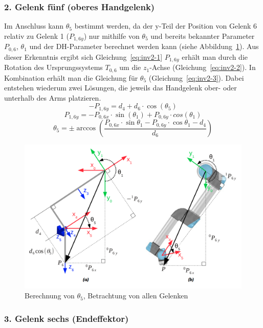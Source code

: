 \subsubsection{2. Gelenk fünf (oberes Handgelenk)}

Im Anschluss kann $\theta_5$ bestimmt werden, da der y-Teil der Position von Gelenk 6 relativ zu Gelenk 1 ($P_{1,6y}$) nur mithilfe von $\theta_5$ und bereits bekannter Parameter $P_{0,6}$, $\theta_1$ und der DH-Parameter berechnet werden kann (siehe Abbildung~\ref{fig:inv1-2}).
Aus dieser Erkenntnis ergibt sich Gleichung~\ref{eq:inv2-1}
$P_{1,6y}$ erhält man durch die Rotation des Ursprungssystems $T_{0,6}$ um die $z_1$-Achse (Gleichung~\ref{eq:inv2-2}).
In Kombination erhält man die Gleichung für $\theta_5$ (Gleichung~\ref{eq:inv2-3}).
Dabei entstehen wiederum zwei Lösungen, die jeweils das Handgelenk ober- oder unterhalb des Arms platzieren.
\begin{equation}
    - P_{1,6y} = d_4 + d_6 \cdot \cos(\theta_5)
    \label{eq:inv2-1}
\end{equation}
\begin{equation}
    P_{1,6y} = - P_{0,6x} \cdot \sin(\theta_1) + P_{0,6y} \cdot cos(\theta_1)
    \label{eq:inv2-2}
\end{equation}
\begin{equation}
    \theta_5 = \pm \arccos \left( \frac{ P_{0,6x} \cdot \sin\theta_1 - P_{0,6y} \cdot \cos\theta_1 - d_4 }{ d_6 } \right)
    \label{eq:inv2-3}
\end{equation}
\begin{figure}[h]
    \centering
    \includegraphics[width = .5\textwidth]{Bilder/inv2}
    \caption{Berechnung von $\theta_5$, Betrachtung von allen Gelenken~\cite{rasmusandersenKinematicsUR52018}}\label{fig:inv1-2}
\end{figure}

\subsubsection{3. Gelenk sechs (Endeffektor)}

